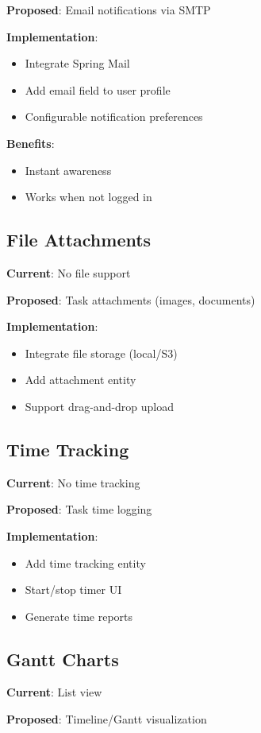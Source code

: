 \documentclass[12pt,a4paper,twoside]{book}
\begin{document}
\textbf{Proposed}: Email notifications via SMTP

\textbf{Implementation}:
\begin{itemize}
    \item Integrate Spring Mail
    \item Add email field to user profile
    \item Configurable notification preferences
\end{itemize}

\textbf{Benefits}:
\begin{itemize}
    \item Instant awareness
    \item Works when not logged in
\end{itemize}

\subsection{File Attachments}
\textbf{Current}: No file support

\textbf{Proposed}: Task attachments (images, documents)

\textbf{Implementation}:
\begin{itemize}
    \item Integrate file storage (local/S3)
    \item Add attachment entity
    \item Support drag-and-drop upload
\end{itemize}

\subsection{Time Tracking}
\textbf{Current}: No time tracking

\textbf{Proposed}: Task time logging

\textbf{Implementation}:
\begin{itemize}
    \item Add time tracking entity
    \item Start/stop timer UI
    \item Generate time reports
\end{itemize}

\subsection{Gantt Charts}
\textbf{Current}: List view

\textbf{Proposed}: Timeline/Gantt visualization
\end{document}
